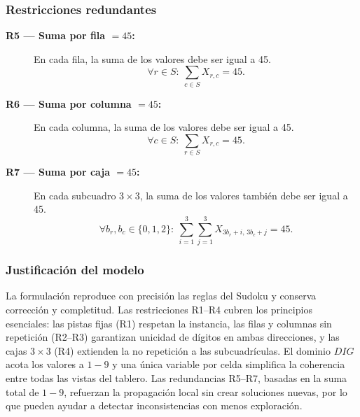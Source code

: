 \subsubsection*{Restricciones redundantes}
\begin{description}
  \item[\textbf{R5 — Suma por fila \(=45\):}] En cada fila, la suma de los valores debe ser igual a 45.  
  \[
  \forall r \in S:\ \sum_{c \in S} X_{r,c} = 45.
  \]

  \item[\textbf{R6 — Suma por columna \(=45\):}] En cada columna, la suma de los valores debe ser igual a 45.  
  \[
  \forall c \in S:\ \sum_{r \in S} X_{r,c} = 45.
  \]

  \item[\textbf{R7 — Suma por caja \(=45\):}] En cada subcuadro \(3\times3\), la suma de los valores también debe ser igual a 45.  
  \[
  \forall b_r, b_c \in \{0,1,2\}:\ 
  \sum_{i=1}^{3} \sum_{j=1}^{3} X_{3b_r+i,\,3b_c+j} = 45.
  \]
\end{description}

\subsubsection*{Justificación del modelo}
La formulación reproduce con precisión las reglas del Sudoku y conserva corrección y completitud. Las restricciones R1–R4 cubren los principios esenciales: las pistas fijas (R1) respetan la instancia, las filas y columnas sin repetición (R2–R3) garantizan unicidad de dígitos en ambas direcciones, y las cajas \(3\times3\) (R4) extienden la no repetición a las subcuadrículas. El dominio \(DIG\) acota los valores a \(1\!-\!9\) y una única variable por celda simplifica la coherencia entre todas las vistas del tablero. Las redundancias R5–R7, basadas en la suma total de \(1\!-\!9\), refuerzan la propagación local sin crear soluciones nuevas, por lo que pueden ayudar a detectar inconsistencias con menos exploración.
